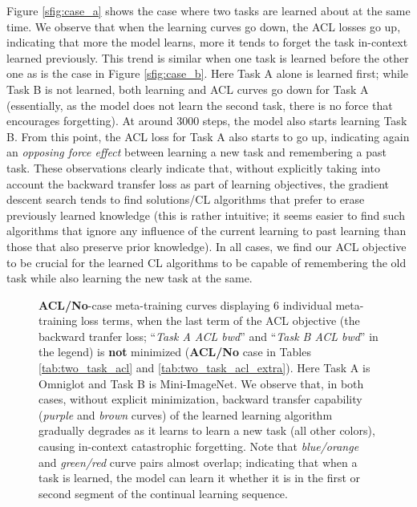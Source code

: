 \documentclass{article}
\begin{document}
Figure \ref{sfig:case_a} shows the case where two tasks are learned about at the same time.
We observe that when the learning curves go down, the ACL losses go up,
indicating that more the model learns, more it tends to forget the task  in-context learned previously.
This trend is similar when one task is learned before the other one as is the case in Figure \ref{sfig:case_b}.
Here Task A alone is learned first; while Task B is not learned, both learning and ACL curves go down for Task A (essentially, as the model does not learn the second task, there is no force that encourages forgetting).
At around 3000 steps, the model also starts learning Task B.
From this point, the ACL loss for Task A also starts to go up, indicating again an \textit{opposing force effect} between learning a new task and remembering a past task.
These observations clearly indicate that, without explicitly taking into account the backward transfer loss as part of learning objectives, the gradient descent search tends to find solutions/CL algorithms that prefer to erase previously learned knowledge (this is rather intuitive; it seems easier to find such algorithms that ignore any influence of the current learning to past learning than those that also preserve prior knowledge).
In all cases, we find our ACL objective to be crucial for the learned CL algorithms to be capable of remembering the old task while also learning the new task at the same.

\begin{figure}[t]
 \hspace{3mm}
	\caption{\textbf{ACL/No}-case meta-training curves displaying 6 individual meta-training loss terms,  when the last term of the ACL objective (the backward tranfer loss; ``\textit{Task A ACL bwd}'' and ``\textit{Task B ACL bwd}'' in the legend) is \textbf{not} minimized (\textbf{ACL/No} case in Tables \ref{tab:two_task_acl} and \ref{tab:two_task_acl_extra}). Here Task A is Omniglot and Task B is Mini-ImageNet. We observe that, in both cases, without explicit minimization, backward transfer capability (\textit{purple} and \textit{brown} curves) of the learned learning algorithm gradually degrades as it learns to learn a new task (all other colors), causing in-context catastrophic forgetting. Note that \textit{blue/orange} and \textit{green/red} curve pairs almost overlap; indicating that when a task is learned, the model can learn it whether it is in the first or second segment of the continual learning sequence.}
	\label{fig:dmlab}
		\vspace{-3mm}
\end{figure}
\end{document}
